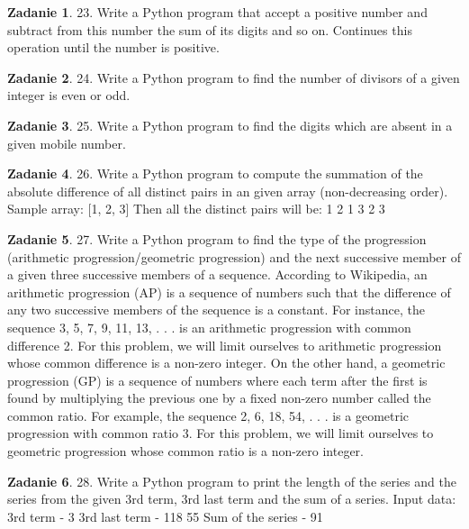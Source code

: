 \documentclass[11pt]{article}
\theoremstyle{definition}
\newtheorem{zadanie}{Zadanie}
\begin{document}
\begin{zadanie}
23. Write a Python program that accept a positive number and subtract from this number the sum of its digits and so on. Continues this operation until the number is positive.
\end{zadanie}

\begin{zadanie}
24. Write a Python program to find the number of divisors of a given integer is even or odd.
\end{zadanie}

\begin{zadanie}
25. Write a Python program to find the digits which are absent in a given mobile number.
\end{zadanie}

\begin{zadanie}
26. Write a Python program to compute the summation of the absolute difference of all distinct pairs in an given array (non-decreasing order).
Sample array: [1, 2, 3]
Then all the distinct pairs will be:
1 2
1 3
2 3
\end{zadanie}

\begin{zadanie}
27. Write a Python program to find the type of the progression (arithmetic progression/geometric progression) and the next successive member of a given three successive members of a sequence.
According to Wikipedia, an arithmetic progression (AP) is a sequence of numbers such that the difference of any two successive members of the sequence is a constant. For instance, the sequence 3, 5, 7, 9, 11, 13, . . . is an arithmetic progression with common difference 2. For this problem, we will limit ourselves to arithmetic progression whose common difference is a non-zero integer.
On the other hand, a geometric progression (GP) is a sequence of numbers where each term after the first is found by multiplying the previous one by a fixed non-zero number called the common ratio. For example, the sequence 2, 6, 18, 54, . . . is a geometric progression with common ratio 3. For this problem, we will limit ourselves to geometric progression whose common ratio is a non-zero integer.
\end{zadanie}

\begin{zadanie}
28. Write a Python program to print the length of the series and the series from the given 3rd term, 3rd last term and the sum of a series.
Input data:
3rd term - 3
3rd last term - 118 55
Sum of the series - 91
\end{zadanie}
\end{document}
